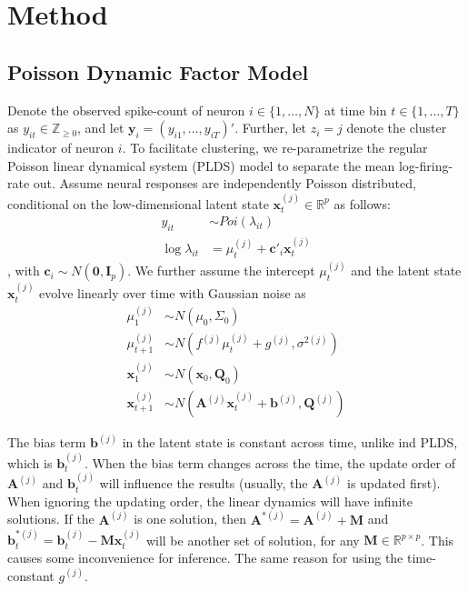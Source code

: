 \documentclass{article}
\begin{document}
	\section{Method}
	\label{method}
	
	\subsection{Poisson Dynamic Factor Model}
	Denote the observed spike-count of neuron $i \in \{ 1,\ldots,N\}$ at
	time bin $t \in \{ 1,\ldots,T\}$ as
	$y_{it} \in \mathbb{Z}_{\geq 0}$, and let
	$\bm{y}_{i} =  (y_{i1},\ldots,y_{iT})'$.
	Further, let $z_{i} = j$ denote the cluster indicator of neuron $i$. To facilitate clustering, we re-parametrize the regular Poisson linear dynamical system (PLDS) model \citep{Macke2011} to separate the mean log-firing-rate out. Assume neural responses are independently Poisson distributed, conditional on the
	low-dimensional latent state $\bm{x}_{t}^{(j)} \in \mathbb{R}^{p}$ as follows:
	\begin{align*}
		y_{it} &\sim Poi(\lambda_{it})\\
		\log\lambda_{it} &= \mu_t^{(j)} + \bm{c}'_i\bm{x}^{(j)}_t
	\end{align*}
	, with $\bm{c}_i\sim N(\bm{0},\bm{I}_p)$. We further assume the intercept $\mu_t^{(j)}$ and the latent state $\bm{x}^{(j)}_t$ evolve linearly over time with Gaussian noise as
	\begin{align*}
		\mu_1^{(j)} &\sim N(\mu_0, \Sigma_0)\\
		\mu_{t+1}^{(j)} &\sim N(f^{(j)}\mu_t^{(j)} + g^{(j)}, \sigma^{2(j)})\\
		\bm{x}_1^{(j)} &\sim N(\bm{x}_0, \bm{Q}_0)\\
		\bm{x}_{t+1}^{(j)} &\sim N(\bm{A}^{(j)}\bm{x}_t^{(j)} + \bm{b}^{(j)}, \bm{Q}^{(j)})
	\end{align*}
	
	The bias term $\bm{b}^{(j)}$ in the latent state is constant across time, unlike ind PLDS, which is  $\bm{b}_t^{(j)}$. When the bias term changes across the time, the update order of $\bm{A}^{(j)}$ and $\bm{b}_t^{(j)}$ will influence the results (usually, the $\bm{A}^{(j)}$ is updated first). When ignoring the updating order, the linear dynamics will have infinite solutions. If the $\bm{A}^{(j)}$ is one solution, then $\bm{A}^{*(j)} = \bm{A}^{(j)} + \bm{M}$ and $\bm{b}_t^{*(j)} = \bm{b}_t^{(j)} - \bm{M}\bm{x}^{(j)}_t$ will be another set of solution, for any $\bm{M} \in \mathbb{R}^{p\times p}$. This causes some inconvenience for inference. The same reason for using the time-constant $g^{(j)}$.
	
\end{document}
